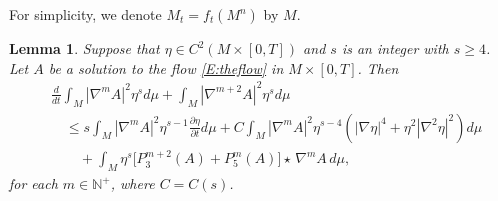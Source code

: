 \documentclass{amsart}
\newtheorem{lemma}[theorem]{Lemma}
\theoremstyle{definition}
\numberwithin{equation}{section}
\begin{document}
 For simplicity, we denote $M_t=f_t(M^n)$  by $M$.
\begin{lemma} \label{T:e2}
Suppose that $\eta \in C^{2}\left( M \times
\left[ 0, T\right] \right)$ and $s$ is an integer with $s\geq 4$. Let $A$ be  a solution to
the flow \eqref{E:theflow} in $M\times [0, T]$. Then
\begin{align}\label{Lmc}
  &\frac{d}{dt} \int_{M}  \left| \nabla^{m} A \right|^{2}  \eta^{s} d\mu + \int_{M}  \left| \nabla^{m+2} A \right|^{2}  \eta^{s} d\mu \\
  & \quad \leq s \int_{M} \left| \nabla^{m} A \right|^{2} \eta^{s-1} \frac{\partial  \eta}{\partial t} d\mu
  +C \int_{M} \left| \nabla^m A \right|^{2}  \eta^{s-4} \left( \left| \nabla  \eta \right|^{4} +  \eta^2 \left| \nabla^{2} \eta
  \right|^{2} \right) d\mu \nonumber\\
  &\qquad + \int_{M}  \eta^{s} \Big[ P_{3}^{m+2}(A)+ P_{5}^{m}(A) \Big] \star \, \nabla^{m} A \, d\mu \mbox{,}\nonumber
\end{align}
for each $m\in\mathbb{N^+}$, where $C=C\left( s\right)$.
\end{lemma}
\end{document}
